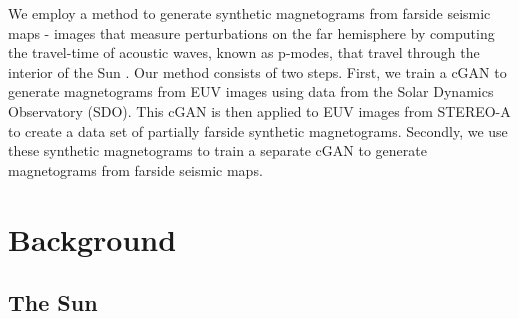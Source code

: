 \documentclass[11pt,a4paper,onecolumn]{report}
\begin{document}


We employ a method to generate synthetic magnetograms from farside seismic maps
- images that measure perturbations on the far hemisphere by computing the
travel-time of acoustic waves, known as p-modes, that travel through the
interior of the Sun \citep{Lindsey2017}. Our method consists of two steps.
First, we train a cGAN to generate magnetograms from EUV images using data from
the Solar Dynamics Observatory (SDO). This cGAN is then applied to EUV images
from STEREO-A to create a data set of partially farside synthetic magnetograms.
Secondly, we use these synthetic magnetograms to train a separate cGAN to
generate magnetograms from farside seismic maps.





%
%
%
%
%
%
\chapter{Background}
%
%
%
%
%
%


%
%
%
%
%
%

\section{The Sun}
\label{sec:Sun}
\end{document}
